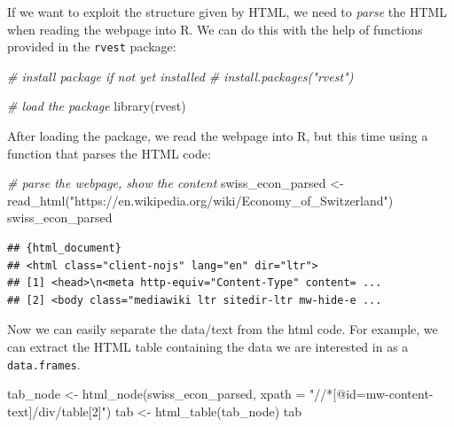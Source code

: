 \documentclass[
  12pt,
]{style/krantz}
\newenvironment{Shaded}{\begin{snugshade}}{\end{snugshade}}
\newcommand{\AttributeTok}[1]{\textcolor[rgb]{0.77,0.63,0.00}{#1}}
\newcommand{\CommentTok}[1]{\textcolor[rgb]{0.56,0.35,0.01}{\textit{#1}}}
\newcommand{\FunctionTok}[1]{\textcolor[rgb]{0.00,0.00,0.00}{#1}}
\newcommand{\NormalTok}[1]{#1}
\newcommand{\OtherTok}[1]{\textcolor[rgb]{0.56,0.35,0.01}{#1}}
\newcommand{\StringTok}[1]{\textcolor[rgb]{0.31,0.60,0.02}{#1}}
\begin{document}
If we want to exploit the structure given by HTML, we need to \emph{parse} the HTML when reading the webpage into R. We can do this with the help of functions provided in the \texttt{rvest} package:

\begin{Shaded}
\begin{Highlighting}[]
\CommentTok{\# install package if not yet installed}
\CommentTok{\# install.packages("rvest")}

\CommentTok{\# load the package}
\FunctionTok{library}\NormalTok{(rvest)}
\end{Highlighting}
\end{Shaded}

After loading the package, we read the webpage into R, but this time using a function that parses the HTML code:

\begin{Shaded}
\begin{Highlighting}[]
\CommentTok{\# parse the webpage, show the content}
\NormalTok{swiss\_econ\_parsed }\OtherTok{\textless{}{-}} \FunctionTok{read\_html}\NormalTok{(}\StringTok{"https://en.wikipedia.org/wiki/Economy\_of\_Switzerland"}\NormalTok{)}
\NormalTok{swiss\_econ\_parsed}
\end{Highlighting}
\end{Shaded}

\begin{verbatim}
## {html_document}
## <html class="client-nojs" lang="en" dir="ltr">
## [1] <head>\n<meta http-equiv="Content-Type" content= ...
## [2] <body class="mediawiki ltr sitedir-ltr mw-hide-e ...
\end{verbatim}

Now we can easily separate the data/text from the html code. For example, we can extract the HTML table containing the data we are interested in as a \texttt{data.frames}.

\begin{Shaded}
\begin{Highlighting}[]
\NormalTok{tab\_node }\OtherTok{\textless{}{-}} \FunctionTok{html\_node}\NormalTok{(swiss\_econ\_parsed, }\AttributeTok{xpath =} \StringTok{"//*[@id=\textquotesingle{}mw{-}content{-}text\textquotesingle{}]/div/table[2]"}\NormalTok{)}
\NormalTok{tab }\OtherTok{\textless{}{-}} \FunctionTok{html\_table}\NormalTok{(tab\_node)}
\NormalTok{tab}
\end{Highlighting}
\end{Shaded}
\end{document}
